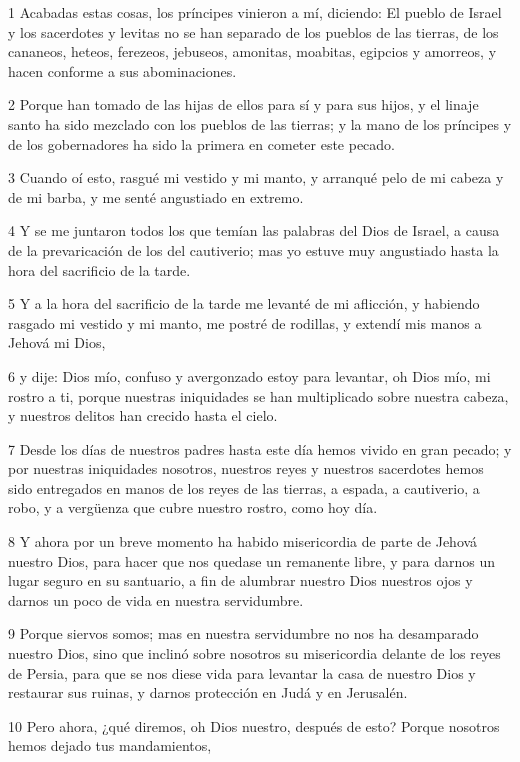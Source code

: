 \par 1 Acabadas estas cosas, los príncipes vinieron a mí, diciendo: El pueblo de Israel y los sacerdotes y levitas no se han separado de los pueblos de las tierras, de los cananeos, heteos, ferezeos, jebuseos, amonitas, moabitas, egipcios y amorreos, y hacen conforme a sus abominaciones.
\par 2 Porque han tomado de las hijas de ellos para sí y para sus hijos, y el linaje santo ha sido mezclado con los pueblos de las tierras; y la mano de los príncipes y de los gobernadores ha sido la primera en cometer este pecado.
\par 3 Cuando oí esto, rasgué mi vestido y mi manto, y arranqué pelo de mi cabeza y de mi barba, y me senté angustiado en extremo.
\par 4 Y se me juntaron todos los que temían las palabras del Dios de Israel, a causa de la prevaricación de los del cautiverio; mas yo estuve muy angustiado hasta la hora del sacrificio de la tarde.
\par 5 Y a la hora del sacrificio de la tarde me levanté de mi aflicción, y habiendo rasgado mi vestido y mi manto, me postré de rodillas, y extendí mis manos a Jehová mi Dios,
\par 6 y dije: Dios mío, confuso y avergonzado estoy para levantar, oh Dios mío, mi rostro a ti, porque nuestras iniquidades se han multiplicado sobre nuestra cabeza, y nuestros delitos han crecido hasta el cielo.
\par 7 Desde los días de nuestros padres hasta este día hemos vivido en gran pecado; y por nuestras iniquidades nosotros, nuestros reyes y nuestros sacerdotes hemos sido entregados en manos de los reyes de las tierras, a espada, a cautiverio, a robo, y a vergüenza que cubre nuestro rostro, como hoy día.
\par 8 Y ahora por un breve momento ha habido misericordia de parte de Jehová nuestro Dios, para hacer que nos quedase un remanente libre, y para darnos un lugar seguro en su santuario, a fin de alumbrar nuestro Dios nuestros ojos y darnos un poco de vida en nuestra servidumbre.
\par 9 Porque siervos somos; mas en nuestra servidumbre no nos ha desamparado nuestro Dios, sino que inclinó sobre nosotros su misericordia delante de los reyes de Persia, para que se nos diese vida para levantar la casa de nuestro Dios y restaurar sus ruinas, y darnos protección en Judá y en Jerusalén.
\par 10 Pero ahora, ¿qué diremos, oh Dios nuestro, después de esto? Porque nosotros hemos dejado tus mandamientos,
